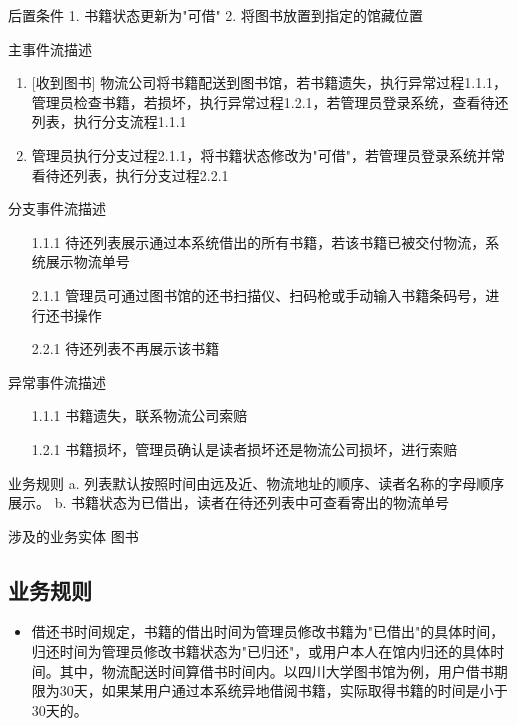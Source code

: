     后置条件     1. 书籍状态更新为"可借"       2. 将图书放置到指定的馆藏位置   
    
    主事件流描述   \begin{enumerate} 
            \item  {[收到图书]} 物流公司将书籍配送到图书馆，若书籍遗失，执行异常过程1.1.1，管理员检查书籍，若损坏，执行异常过程1.2.1，若管理员登录系统，查看待还列表，执行分支流程1.1.1
            \item 管理员执行分支过程2.1.1，将书籍状态修改为"可借"，若管理员登录系统并常看待还列表，执行分支过程2.2.1
        \end{enumerate}  
    
    分支事件流描述  \begin{itemize}
        \item[1.1.1] 待还列表展示通过本系统借出的所有书籍，若该书籍已被交付物流，系统展示物流单号
        \item[2.1.1] 管理员可通过图书馆的还书扫描仪、扫码枪或手动输入书籍条码号，进行还书操作
        \item[2.2.1] 待还列表不再展示该书籍 
    \end{itemize}     
    
    异常事件流描述  \begin{itemize}
        \item[1.1.1] 书籍遗失，联系物流公司索赔
        \item[1.2.1] 书籍损坏，管理员确认是读者损坏还是物流公司损坏，进行索赔
    \end{itemize}                                                                               
    
    业务规则      a. 列表默认按照时间由远及近、物流地址的顺序、读者名称的字母顺序展示。   b. 书籍状态为已借出，读者在待还列表中可查看寄出的物流单号   
    
    涉及的业务实体  图书      
\subsection{业务规则}
\begin{itemize}
    \item 借还书时间规定，书籍的借出时间为管理员修改书籍为"已借出"的具体时间，归还时间为管理员修改书籍状态为"已归还"，或用户本人在馆内归还的具体时间。其中，物流配送时间算借书时间内。以四川大学图书馆为例，用户借书期限为30天，如果某用户通过本系统异地借阅书籍，实际取得书籍的时间是小于30天的。    
\end{itemize}
